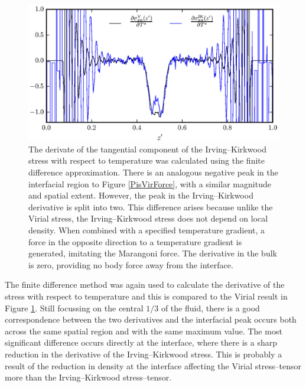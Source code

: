 \begin{figure}[h]
\centering
\includegraphics[scale=1.0]{PisIKForce}
\caption{The derivate of the tangential component of the Irving--Kirkwood stress with respect to temperature was calculated using the finite difference approximation.
There is an analogous negative peak in the interfacial region to Figure \ref{PisVirForce}, with a similar magnitude and spatial extent.
However, the peak in the Irving--Kirkwood derivative is split into two.
This difference arises because unlike the Virial stress, the Irving--Kirkwood stress does not depend on local density.
When combined with a specified temperature gradient, a force in the opposite direction to a temperature gradient is generated, imitating the Marangoni force.
The derivative in the bulk is zero, providing no body force away from the interface.
}
\label{PisIKForce}
\end{figure}
The finite difference method was again used to calculate the derivative of the stress with respect to temperature and this is compared to the Virial result in Figure \ref{PisIKForce}.
Still focussing on the central $1/3$ of the fluid, there is a good correspondence between the two derivatives and the interfacial peak occurs both across the same spatial region and with the same maximum value.
The most significant difference occurs directly at the interface, where there is a sharp reduction in the derivative of the Irving--Kirkwood stress.
This is probably a result of the reduction in density at the interface affecting the Virial stress--tensor more than the Irving--Kirkwood stress--tensor.
\FloatBarrier


